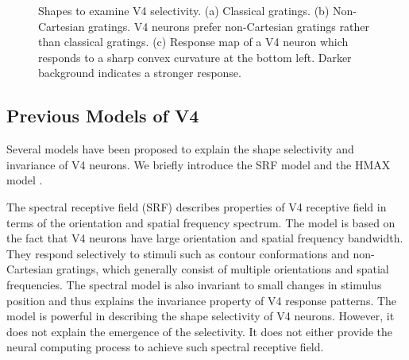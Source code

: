 \documentclass[conference]{IEEEtran}
\begin{document}
\begin{figure}[htp]
\centering
{}\hfil
{}\hfil
{}
\caption{Shapes to examine V4 selectivity.
(a) Classical gratings.
(b) Non-Cartesian gratings. V4 neurons prefer non-Cartesian gratings rather than classical gratings.
(c) Response map of a V4 neuron which responds to a sharp convex curvature at the bottom left.
Darker background indicates a stronger response.}
\label{fig:2}
\end{figure}

\subsection{Previous Models of V4}

Several models have been proposed to explain the shape selectivity and invariance of V4 neurons.
We briefly introduce the SRF model \cite{david2006} and the HMAX model \cite{riesenhuber1999,cadieu2007}.

The spectral receptive field (SRF) \cite{david2006}
describes properties of V4 receptive field in terms of the orientation and spatial frequency spectrum.
The model is based on the fact that V4 neurons have large orientation and spatial frequency bandwidth.
They respond selectively to stimuli such as contour conformations and non-Cartesian gratings,
which generally consist of multiple orientations and spatial frequencies.
The spectral model is also invariant to small changes in stimulus position 
and thus explains the invariance property of V4 response patterns.
The model is powerful in describing the shape selectivity of V4 neurons.
However, it does not explain the emergence of the selectivity.
It does not either provide the neural computing process to achieve such spectral receptive field.
\end{document}
